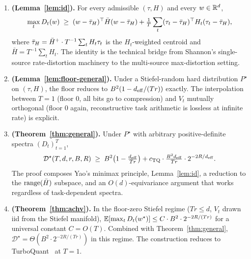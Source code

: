 \begin{enumerate}[leftmargin=*,topsep=2pt,itemsep=2pt]
\item \textbf{ (Lemma~\ref{lem:id}).} For every admissible $(\tau,H)$
and every $w\in\mathbb{R}^d$,
\[
\max_t D_t(w)\;\geq\; (w-\bar{\tau}_H)^\top\bar H(w-\bar{\tau}_H)
+ \tfrac{1}{T}\sum_t (\tau_t-\bar{\tau}_H)^\top H_t(\tau_t-\bar{\tau}_H),
\]
where $\bar{\tau}_H = \bar H^+\cdot T^{-1}\sum_t H_t\tau_t$ is the
$H_t$-weighted centroid and $\bar H = T^{-1}\sum_t H_t$. The
identity is the technical bridge from Shannon's single-source
rate-distortion machinery to the multi-source max-distortion
setting.

\item \textbf{ (Lemma~\ref{lem:floor-general}).}
Under a Stiefel-random hard distribution $P^\star$ on
$(\tau, H)$, the floor reduces to $B^2(1 - d_{\mathrm{eff}}/(Tr))$
exactly. The interpolation between $T=1$ (floor $0$, all bits
go to compression) and $V_t$ mutually orthogonal (floor $0$
again, reconstructive task arithmetic is lossless at infinite
rate) is explicit.

\item \textbf{ (Theorem~\ref{thm:general}).} Under $P^\star$ with
arbitrary positive-definite spectra $(D_t)_{t=1}^T$, 
\begin{equation*}
\mathcal{D}^\star(T,d,r,B,R)\;\geq\;
B^2\!\left(1 - \tfrac{d_{\mathrm{eff}}}{Tr}\right) +
c_{\mathrm{TQ}}\cdot\tfrac{B^2d_{\mathrm{eff}}}{Tr}\cdot 2^{-2R/d_{\mathrm{eff}}}.
\end{equation*}
The proof composes Yao's minimax principle, Lemma~\ref{lem:id},
a reduction to the $\operatorname{range}(\bar H)$ subspace, and an
$O(d)$-equivariance argument that works regardless of
task-dependent spectra.

\item \textbf{ (Theorem~\ref{thm:achv}).}
In the floor-zero Stiefel regime ($Tr\leq d$, $V_t$ drawn iid
from the Stiefel manifold), 
$\mathbb{E}[\max_t D_t(w^\star)]\leq C\cdot B^2\cdot 2^{-2R/(Tr)}$
for a universal constant $C = O(T)$. Combined with
Theorem~\ref{thm:general},
$\mathcal{D}^\star = \Theta\!\left(B^2\cdot 2^{-2R/(Tr)}\right)$
in this regime. The construction reduces to
TurboQuant~\cite{zandieh2025turboquant} at $T=1$.


\end{enumerate}
